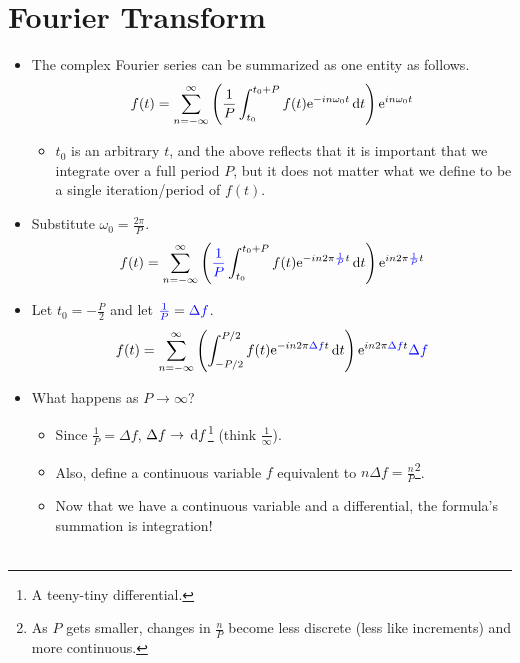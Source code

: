 \documentclass{article}
\begin{document}
\section*{Fourier Transform}
\begin{itemize}
    \item {}The complex Fourier series can be summarized as one entity as follows.
    \begin{equation*}
        f(t) = \sum_{n=-\infty}^\infty \left( \frac{1}{P}\int_{t_0}^{t_0+P} f(t)\e[-in\omega_0t]\D{t} \right)\e[in\omega_0t]
    \end{equation*}
    \begin{itemize}
        \item $t_0$ is an arbitrary $t$, and the above reflects that it is important that we integrate over a full period $P$, but it does not matter what we define to be a single iteration/period of $f(t)$.
    \end{itemize}
    \item Substitute $\omega_0 = \frac{2\pi}{P}$.
    \begin{equation*}
        f(t) = \sum_{n=-\infty}^\infty \left( {\color{blue}\frac{1}{P}}\int_{t_0}^{t_0+P} f(t)\e[-in2\pi{\color{blue}\frac{1}{P}}t]\D{t} \right)\e[in2\pi{\color{blue}\frac{1}{P}}t]
    \end{equation*}
    \item Let $t_0=-\frac{P}{2}$ and let ${\color{blue}\frac{1}{P}} = {\color{blue}\Delta f}$.
    \begin{equation*}
        f(t) = \sum_{n=-\infty}^\infty \left( \int_{-P/2}^{P/2} f(t)\e[-in2\pi{\color{blue}\Delta f}t]\D{t} \right)\e[in2\pi{\color{blue}\Delta f}t]{\color{blue}\Delta f}
    \end{equation*}
    \item What happens as $P\to\infty$?
    \begin{itemize}
        \item Since $\frac{1}{P} = \Delta f$, $\Delta f\to\D{f}$\footnote{A teeny-tiny differential.} (think $\frac{1}{\infty}$).
        \item Also, define a continuous variable $f$ equivalent to $n\Delta f = \frac{n}{P}$\footnote{As $P$ gets smaller, changes in $\frac{n}{P}$ become less discrete (less like increments) and more continuous.}.
        \item Now that we have a continuous variable and a differential, the formula's summation is integration!
    \end{itemize}
    \begin{align*}

\end{align*}
\end{itemize}
\end{document}
